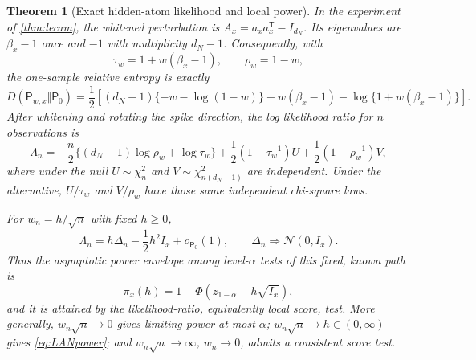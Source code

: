 \documentclass[11pt]{article}
\newtheorem{theorem}{Theorem}[section]
\theoremstyle{definition}
\theoremstyle{remark}
\begin{document}
\begin{theorem}[Exact hidden-atom likelihood and local power]
\label{thm:exactLAN}
In the experiment of \cref{thm:lecam}, the whitened perturbation is
$A_x=a_xa_x^{\mathsf T}-I_{d_N}$.  Its eigenvalues are
$\beta_x-1$ once and $-1$ with multiplicity $d_N-1$.  Consequently, with
\begin{equation}
 \tau_w=1+w(\beta_x-1),\qquad \rho_w=1-w,             \label{eq:spikeeigs}
\end{equation}
the one-sample relative entropy is exactly
\begin{equation}
 D(\mathsf P_{w,x}\Vert\mathsf P_0)
 =\frac12\left[(d_N-1)\{-w-\log(1-w)\}
 +w(\beta_x-1)-\log\{1+w(\beta_x-1)\}\right].       \label{eq:exactKL}
\end{equation}
After whitening and rotating the spike direction, the log likelihood ratio
for $n$ observations is
\begin{equation}
 \Lambda_n=-\frac n2\{(d_N-1)\log\rho_w+\log\tau_w\}
 +\frac12(1-\tau_w^{-1})U
 +\frac12(1-\rho_w^{-1})V,                           \label{eq:exactLR}
\end{equation}
where under the null $U\sim\chi_n^2$ and
$V\sim\chi_{n(d_N-1)}^2$ are independent.  Under the alternative,
$U/\tau_w$ and $V/\rho_w$ have those same independent chi-square laws.

For $w_n=h/\sqrt n$ with fixed $h\geq0$,
\begin{equation}
 \Lambda_n=h\Delta_n-\frac12h^2I_x+o_{\mathsf P_0}(1),
 \qquad \Delta_n\Longrightarrow\mathcal N(0,I_x).    \label{eq:LAN}
\end{equation}
Thus the asymptotic power envelope among level-$\alpha$ tests of this fixed,
known path is
\begin{equation}
 \pi_x(h)=1-\Phi\!\left(z_{1-\alpha}-h\sqrt{I_x}\right),
                                                               \label{eq:LANpower}
\end{equation}
and it is attained by the likelihood-ratio, equivalently local score, test.
More generally, $w_n\sqrt n\to0$ gives limiting power at most $\alpha$;
$w_n\sqrt n\to h\in(0,\infty)$ gives \eqref{eq:LANpower}; and
$w_n\sqrt n\to\infty$, $w_n\to0$, admits a consistent score test.
\end{theorem}
\end{document}
